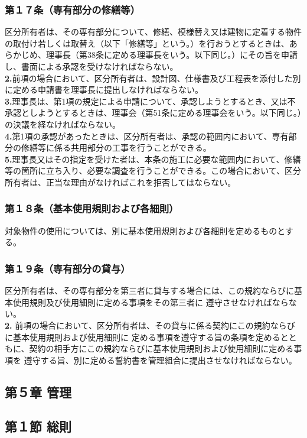 \documentclass[12pt,uplatex]{jsarticle}
\begin{document}
\subsubsection*{第１７条（専有部分の修繕等）}
区分所有者は、その専有部分について、修繕、模様替え又は建物に定着する物件の取付け若しくは取替え（以下「修繕等」という。）を行おうとするときは、あらかじめ、理事長（第38条に定める理事長をいう。以下同じ。）にその旨を申請し、書面による承認を受けなければならない。\\
\textbf{2.}前項の場合において、区分所有者は、設計図、仕様書及び工程表を添付した別に定める申請書を理事長に提出しなければならない。\\
\textbf{3.}理事長は、第1項の規定による申請について、承認しようとするとき、又は不承認としようとするときは、理事会（第51条に定める理事会をいう。以下同じ。）の決議を経なければならない。\\
\textbf{4.}第1項の承認があったときは、区分所有者は、承認の範囲内において、専有部分の修繕等に係る共用部分の工事を行うことができる。\\
\textbf{5.}理事長又はその指定を受けた者は、本条の施工に必要な範囲内において、修繕等の箇所に立ち入り、必要な調査を行うことができる。この場合において、区分所有者は、正当な理由がなければこれを拒否してはならない。
\subsubsection*{第１８条（基本使用規則および各細則）}
対象物件の使用については、別に基本使用規則および各細則を定めるものとする。
\subsubsection*{第１９条（専有部分の貸与）}
区分所有者は、その専有部分を第三者に貸与する場合には、この規約ならびに基本使用規則及び使用細則に定める事項をその第三者に
遵守させなければならない。\\
\textbf{2.} 前項の場合において、区分所有者は、その貸与に係る契約にこの規約ならびに基本使用規則および使用細則に
定める事項を遵守する旨の条項を定めるとともに、契約の相手方にこの規約ならびに基本使用規則および使用細則に定める事項を
遵守する旨、別に定める誓約書を管理組合に提出させなければならない。

\begin{center}
\subsection*{第５章 管理}
\subsection*{第１節 総則}
\end{center}
\end{document}
